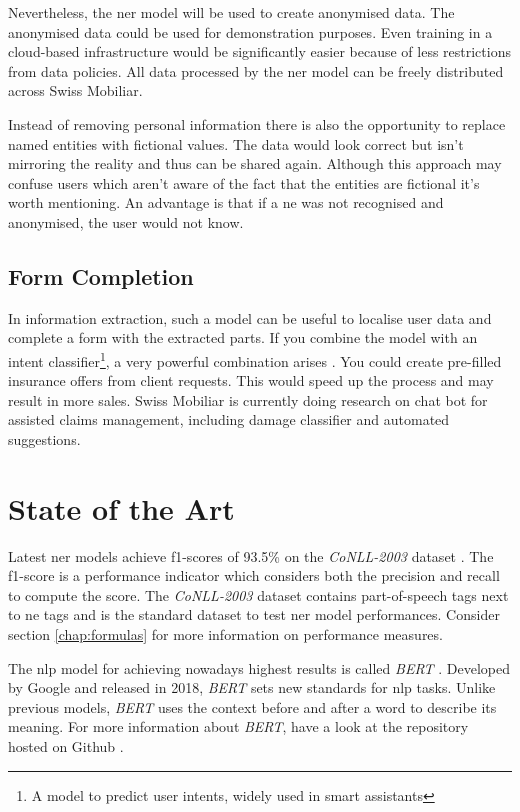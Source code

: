 Nevertheless, the \acrshort{ner} model will be used to create anonymised data. The anonymised data could be used for demonstration purposes. Even training in a cloud-based infrastructure would be significantly easier because of less restrictions from data policies. All data processed by the \acrshort{ner} model can be freely distributed across Swiss Mobiliar.

Instead of removing personal information there is also the opportunity to replace named entities with fictional values. The data would look correct but isn't mirroring the reality and thus can be shared again. Although this approach may confuse users which aren't aware of the fact that the entities are fictional it's worth mentioning. An advantage is that if a \acrshort{ne} was not recognised and anonymised, the user would not know.

\subsection{Form Completion}

In information extraction, such a model can be useful to localise user data and complete a form with the extracted parts. If you combine the model with an intent classifier\footnote{A model to predict user intents, widely used in smart assistants}, a very powerful combination arises \cite{jain18}. You could create pre-filled insurance offers from client requests. This would speed up the process and may result in more sales. Swiss Mobiliar is currently doing research on chat bot for assisted claims management, including damage classifier and automated suggestions.

\section{State of the Art}

Latest \acrshort{ner} models achieve f1-scores of 93.5\% on the \emph{CoNLL-2003} dataset \cite{art19}. The f1-score is a performance indicator which considers both the precision and recall to compute the score. The \emph{CoNLL-2003} dataset contains part-of-speech tags next to \acrlong{ne} tags and is the standard dataset to test \acrshort{ner} model performances. Consider section \ref{chap:formulas} for more information on performance measures.

The \acrshort{nlp} model for achieving nowadays highest results is called \emph{BERT} \cite{bert18}. Developed by Google and released in 2018, \emph{BERT} sets new standards for \acrlong{nlp} tasks. Unlike previous models, \emph{BERT} uses the context before and after a word to describe its meaning. For more information about \emph{BERT}, have a look at the repository hosted on Github \cite{bert-gh}.

